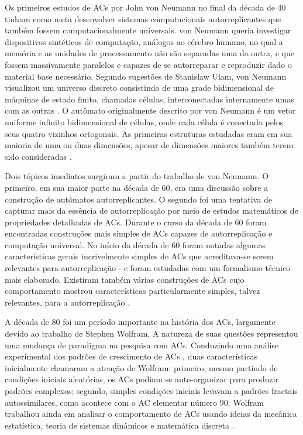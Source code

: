 \documentclass[12pt,a4paper]{article}
\begin{document}
Os primeiros estudos de ACs por John von Neumann no final da década de
40 tinham como meta desenvolver sistemas computacionais autorreplicantes que também fossem
computacionalmente universais. von Neumann queria investigar dispositivos sintéticos de
computação, análogos ao cérebro humano, no qual a memória e as unidades de processamento
não são separadas uma da outra, e que fossem massivamente paralelos e capazes de se
autorreparar e reproduzir dado o material base necessário. Segundo sugestões de
Stanislaw Ulam, von Neumann visualizou um universo discreto consistindo de uma grade
bidimensional de máquinas de estado finito, chamadas células, interconectadas
internamente umas com as outras . O autômato originalmente descrito por
von Neumann é um vetor uniforme infinito bidimensional de células, onde cada célula é
conectada pelos seus quatro vizinhos ortogonais. As primeiras estruturas estudadas eram
em sua maioria de uma ou duas dimensões, apesar de dimensões maiores também terem sido
consideradas .

Dois tópicos imediatos surgiram a partir do trabalho de von Neumann. O primeiro, em
sua maior parte na década de 60, era uma discussão sobre a construção de autômatos
autorreplicantes. O segundo foi uma tentativa de capturar mais da essência de
autorreplicação por meio de estudos matemáticos de propriedades detalhadas de
ACs. Durante o curso da década de 60 foram encontradas construções
mais simples de ACs capazes de autorreplicação e computação
universal. No início da década de 60 foram notadas algumas características gerais
incrivelmente simples de ACs que acreditava-se serem relevantes para
autorreplicação - e foram estudadas com um formalismo técnico mais elaborado. Existiram
também várias construções de ACs cujo comportamento mostrou
características particularmente simples, talvez relevantes, para a autorreplicação .

A década de 80 foi um período importante na história dos ACs,
largamente devido ao trabalho de Stephen Wolfram. A natureza de suas questões
representou uma mudança de paradigma na pesquisa com ACs. Conduzindo
uma análise experimental dos padrões de crescimento de ACs
, duas características inicialmente chamaram a atenção de Wolfram:
primeiro, mesmo partindo de condições iniciais aleatórias, os ACs
podiam se auto-organizar para produzir padrões complexos; segundo, simples condições iniciais levavam a
padrões fractais autossimilares, como acontece com o AC elementar número 90.
Wolfram trabalhou ainda em analisar o comportamento de
ACs usando ideias da mecânica estatística, teoria de sistemas
dinâmicos e matemática discreta .
\end{document}
